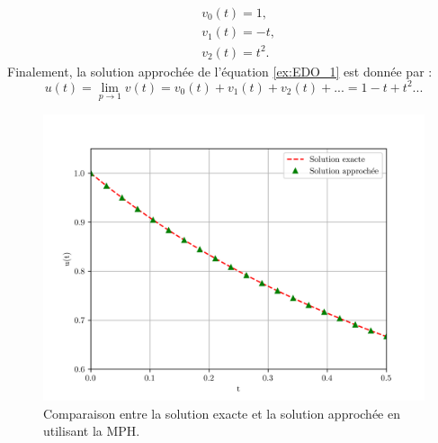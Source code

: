 \begin{align*}
    &v_0(t)=1,\\
    &v_1(t)=-t,\\
    &v_2(t)=t^2.
\end{align*}
Finalement, la solution approchée de l'équation \ref{ex:EDO_1} est donnée par :
\begin{equation}
    u(t)=\lim_{p \to 1} v(t) = v_0(t)+v_1(t)+v_2(t) + ... = 1-t + t^2 ...
\end{equation}
\begin{figure}[H]
    \centering
    \includegraphics[scale = 0.7]{IMAGES/plot.png}
    \caption{Comparaison entre la solution exacte et la solution approchée en utilisant la MPH.}
    \label{fig:sol_EDO_1}
\end{figure}
